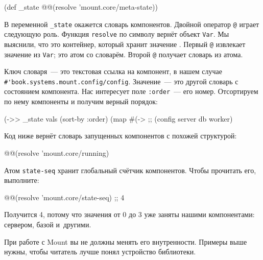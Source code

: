 \begin{english}
  \begin{clojure}
(def _state @@(resolve 'mount.core/meta-state))
  \end{clojure}
\end{english}


В переменной \verb|_state| окажется словарь компонентов. Двойной оператор
\verb|@| играет следующую роль. Функция \verb|resolve| по символу вернёт
объект \verb|Var|. Мы выяснили, что это контейнер, который хранит
значение . Первый \verb|@| извлекает значение из
\verb|Var|; это атом со словарём. Второй \verb|@| получает словарь из атома.

Ключ словаря~--- это текстовая ссылка на компонент, в нашем случае
\verb|#'book.systems.mount.config/config|. Значение~--- это другой словарь с
состоянием компонента. Нас интересует поле \verb|:order|~--- его
номер. Отсортируем по нему компоненты и получим верный порядок:

\begin{english}
  \begin{clojure}
(->> _state
     vals
     (sort-by :order)
     (map #(-> %
;; (config server db worker)
  \end{clojure}
\end{english}

Код ниже вернёт словарь запущенных компонентов с похожей структурой:

\begin{english}
  \begin{clojure}
@@(resolve 'mount.core/running)
  \end{clojure}
\end{english}

Атом \verb|state-seq| хранит глобальный счётчик компонентов. Чтобы прочитать
его, выполните:

\begin{english}
  \begin{clojure}
@@(resolve 'mount.core/state-seq) ;; 4
  \end{clojure}
\end{english}

\noindent
Получится 4, потому что значения от 0 до 3 уже заняты нашими компонентами:
сервером, базой и~другими.

При работе с Mount вы не должны менять его внутренности. Примеры выше нужны,
чтобы читатель лучше понял устройство библиотеки.

